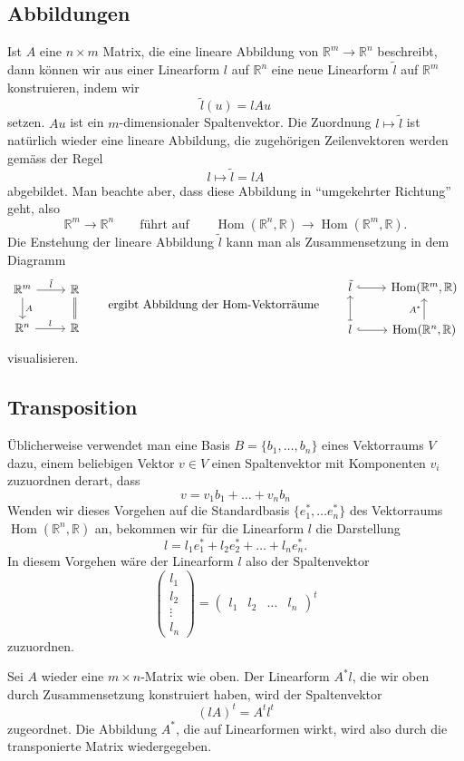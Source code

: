 \subsection{Abbildungen}
Ist $A$ eine $n\times m$ Matrix, die eine lineare Abbildung von
$\mathbb R^m\to\mathbb R^n$
beschreibt, dann können wir aus einer Linearform $l$ auf $\mathbb R^n$ eine
neue Linearform $\tilde l$ auf $\mathbb R^m$ konstruieren, indem wir
\[
\tilde l(u) = lAu
\]
setzen.
$Au$ ist ein $m$-dimensionaler Spaltenvektor.
Die Zuordnung $l\mapsto \tilde l$ ist natürlich wieder eine lineare
Abbildung, die zugehörigen Zeilenvektoren werden gemäss der Regel
\[
l\mapsto \tilde l = lA
\]
abgebildet.
Man beachte aber, dass diese Abbildung in ``umgekehrter Richtung''
geht, also 
\[
\mathbb R^m\to\mathbb R^n
\qquad\text{führt auf}\qquad
\operatorname{Hom}(\mathbb R^n,\mathbb R)
\to
\operatorname{Hom}(\mathbb R^m,\mathbb R).
\]
Die Enstehung der lineare Abbildung $\tilde l$ kann man als Zusammensetzung
in dem Diagramm 
\[
\begin{tikzcd}
\mathbb R^m \ar[d,"A"] \ar[r,"\tilde l"]
	& \mathbb R \ar[d,equal]
\\
\mathbb R^n \ar[r,"l"]
	& \mathbb R
\end{tikzcd}
\qquad
\text{ergibt Abbildung der $\operatorname{Hom}$-Vektorräume}
\qquad
\begin{tikzcd}
\tilde l \ar[r,hook]
	&\operatorname{Hom}(\mathbb R^m,\mathbb R)
\\
l \ar[u, maps to] \ar[r,hook]
	&\operatorname{Hom}(\mathbb R^n,\mathbb R) \ar[u,"A^*"]
\end{tikzcd}
\]
visualisieren.

\subsection{Transposition}
Üblicherweise verwendet man eine Basis $B=\{b_1,\dots,b_n\}$
eines Vektorraums $V$ dazu, einem beliebigen Vektor $v\in V$ einen
Spaltenvektor mit Komponenten $v_i$ zuzuordnen derart, dass
\[
v=v_1b_1+\dots+v_nb_n
\]
Wenden wir dieses Vorgehen auf die Standardbasis $\{e_1^*, \dots e_n^*\}$
des Vektorraums $\operatorname{Hom}(\mathbb R^n, \mathbb R)$ an, bekommen
wir für die Linearform $l$ die Darstellung
\[
l = l_1e_1^* + l_2e_2^* + \dots + l_ne_n^*.
\]
In diesem Vorgehen wäre der Linearform $l$ also der Spaltenvektor
\[
\begin{pmatrix}
l_1\\
l_2\\
\vdots\\
l_n
\end{pmatrix}
=
\begin{pmatrix}l_1&l_2&\dots&l_n \end{pmatrix}^t
\]
zuzuordnen.

Sei $A$ wieder eine $m\times n$-Matrix wie oben.
Der Linearform $A^*l$, die wir oben durch Zusammensetzung konstruiert haben, 
wird der Spaltenvektor
\[
(lA)^t = A^tl^t
\]
zugeordnet.
Die Abbildung $A^*$, die auf Linearformen wirkt, wird also durch die
transponierte Matrix wiedergegeben.



